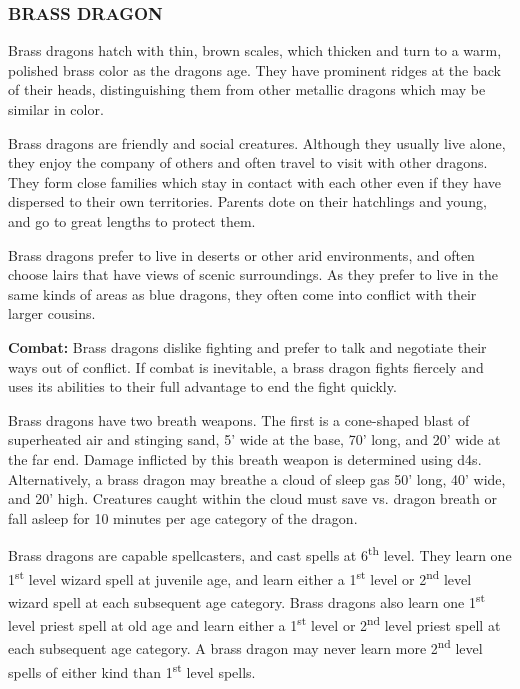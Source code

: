\begin{multicols}{2}

\subsubsection{BRASS DRAGON}

Brass dragons hatch with thin, brown scales, which thicken and turn to a warm, polished brass color as the dragons age. They have prominent ridges at the back of their heads, distinguishing them from other metallic dragons which may be similar in color.

Brass dragons are friendly and social creatures. Although they usually live alone, they enjoy the company of others and often travel to visit with other dragons. They form close families which stay in contact with each other even if they have dispersed to their own territories. Parents dote on their hatchlings and young, and go to great lengths to protect them.

Brass dragons prefer to live in deserts or other arid environments, and often choose lairs that have views of scenic surroundings. As they prefer to live in the same kinds of areas as blue dragons, they often come into conflict with their larger cousins.

\textbf{Combat:} Brass dragons dislike fighting and prefer to talk and negotiate their ways out of conflict. If combat is inevitable, a brass dragon fights fiercely and uses its abilities to their full advantage to end the fight quickly.

Brass dragons have two breath weapons. The first is a cone-shaped blast of superheated air and stinging sand, 5' wide at the base, 70' long, and 20' wide at the far end. Damage inflicted by this breath weapon is determined using d4s. Alternatively, a brass dragon may breathe a cloud of sleep gas 50' long, 40' wide, and 20' high. Creatures caught within the cloud must save vs. dragon breath or fall asleep for 10 minutes per age category of the dragon.

Brass dragons are capable spellcasters, and cast spells at 6\textsuperscript{th} level. They learn one 1\textsuperscript{st} level wizard spell at juvenile age, and learn either a 1\textsuperscript{st} level or 2\textsuperscript{nd} level wizard spell at each subsequent age category. Brass dragons also learn one 1\textsuperscript{st} level priest spell at old age and learn either a 1\textsuperscript{st} level or 2\textsuperscript{nd} level priest spell at each subsequent age category. A brass dragon may never learn more 2\textsuperscript{nd} level spells of either kind than 1\textsuperscript{st} level spells.


\end{multicols}
